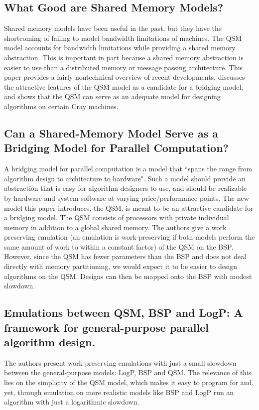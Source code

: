 \documentclass[12pt,a4paper]{article}
\begin{document}
\subsection{What Good are Shared Memory Models?}
Shared memory models have been useful in the past, but they have the shortcoming of failing to model bandwidth limitations of machines. The QSM model
accounts for bandwidth limitations while providing a shared memory abstraction. This is important in part because a shared memory abstraction is easier
to use than a distributed memory or message passing architecture.
This paper provides a fairly nontechnical overview of recent developments, discusses the attractive features of the QSM model as a candidate for a
bridging model, and shows that the QSM can serve as an adequate model for designing algorithms on certain Cray machines.

\subsection{Can a Shared-Memory Model Serve as a Bridging Model for Parallel Computation?}
A bridging model for parallel computation is a model that ``spans the range from algorithm design to architecture to hardware". \cite{Gib99}
Such a model should provide an abstraction that is easy for algorithm designers to use, and should be realizable by hardware and system software at varying
price/performance points.
The new model this paper introduces, the QSM, is meant to be an attractive candidate for a bridging model. The QSM consists of processors with private
individual memory in addition to a global shared memory.
The authors give a work preserving emulation (an emulation is work-preserving if both models perform the same amount of work to within a constant factor) of
the QSM on the BSP. However, since the QSM has fewer parameters than the BSP and does not deal directly with memory partitioning, we would expect it to be
easier to design algorithms on the QSM. Designs can then be mapped onto the BSP with modest slowdown. 

\subsection{Emulations between QSM, BSP and LogP: A framework for general-purpose parallel algorithm design. \cite{Vlr03}}
The authors present work-preserving emulations with just a small slowdown between the general-purpose models: LogP, BSP and QSM. The relevance of this lies 
on the simplicity of the QSM model, which makes it easy to program for and, yet, through emulation on more realistic models like BSP and LogP run an 
algorithm with just a logarithmic slowdown.
\end{document}
